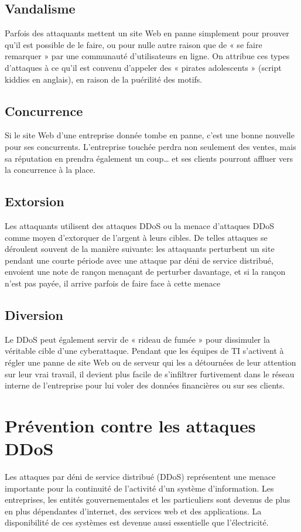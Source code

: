 	\subsection{Vandalisme}
	Parfois des attaquants mettent un site Web en panne simplement pour prouver qu’il est possible de le faire, ou pour nulle autre raison que de « se faire remarquer » par une communauté d’utilisateurs en ligne. On attribue ces types d’attaques à ce qu’il est convenu d’appeler des « pirates adolescents » (script kiddies en anglais), en raison de la puérilité des motifs.

	\subsection{Concurrence}
	Si le site Web d’une entreprise donnée tombe en panne, c’est une bonne nouvelle pour ses concurrents. L’entreprise touchée perdra non seulement des ventes, mais sa réputation en prendra également un coup… et ses clients pourront affluer vers la concurrence à la place.

	\subsection{Extorsion}
	Les attaquants utilisent des attaques DDoS ou la menace d'attaques DDoS comme moyen d'extorquer de l'argent à leurs cibles. De telles attaques se déroulent souvent de la manière suivante: les attaquants perturbent un site pendant une courte période avec une attaque par déni de service distribué, envoient une note de rançon menaçant de perturber davantage, et si la rançon n'est pas payée, il arrive parfois de faire face à cette menace

	\subsection{Diversion}
	Le DDoS peut également servir de « rideau de fumée » pour dissimuler la véritable cible d’une cyberattaque. Pendant que les équipes de TI s’activent à régler une panne de site Web ou de serveur qui les a détournées de leur attention sur leur vrai travail, il devient plus facile de s’infiltrer furtivement dans le réseau interne de l’entreprise pour lui voler des données financières ou sur ses clients.


	\section{Prévention contre les attaques DDoS}
	Les attaques par déni de service distribué (DDoS) représentent une menace importante pour la continuité de l’activité d’un système d’information. Les entreprises, les entités gouvernementales et les particuliers sont devenus de plus en plus dépendantes d’internet, des services web et des applications. La disponibilité de ces systèmes est devenue aussi essentielle que l’électricité.\\

